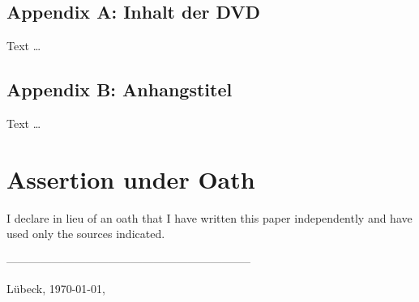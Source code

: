 \section*{Appendix A: Inhalt der DVD}
\begin{comment}
Oft ein Default: Was findet man auf der beiliegenden DVD in welchem Verzeichnis? Max. 1 Seite.

\textbf{In jedem Fall} die PDF der Arbeit, den Programmcode, Daten (anonymisiert!).

\textbf{Niemals} Interviewaufzeichnungen, Einverständniserklärungen oder ähnliche personenbezogene Daten auf die DVD brennen — Sie haben in den meisten Fällen Anonymität zugesichert und die DVD ist frei zugänglich (ein Exemplar der Arbeit kommt in die Bibliothek). 
\end{comment}

Text \dots

{}
\section*{Appendix B: Anhangstitel}
\begin{comment}
Weitere Inhalte je nachdem, wo der Leser ohne großen Aufwand hinspringen sollte.
\end{comment}

Text \dots

\clearpage

{}
\chapter*{Assertion under Oath}
I declare in lieu of an oath that I have written this paper independently and have used only the sources indicated.

\begin{comment}
[Nach Ausdruck unterschreiben. Muss auf Papier sein.]
\end{comment}

-----------------------------------------------------------------

Lübeck, \today, \authorMA